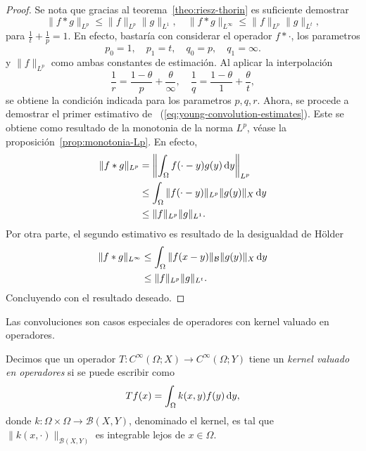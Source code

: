 \begin{proof}
    Se nota que gracias al teorema~\ref{theo:riesz-thorin} es suficiente 
    demostrar 
    \begin{equation}\label{eq:young-convolution-estimates}
        \|f*g\|_{L^p} \leq \|f\|_{L^p} \|g\|_{L^1}, \quad 
        \|f*g\|_{L^\infty} \leq \|f\|_{L^p} \|g\|_{L^t},
    \end{equation}
    para $\frac{1}{t} + \frac{1}{p} = 1$. En efecto, bastaría con considerar 
    el operador $f * \cdot$, los parametros
    \begin{equation*}
        p_0 = 1, \quad p_1 = t, \quad q_0 = p, \quad q_1 = \infty.
    \end{equation*}
    y $\|f\|_{L^p}$ como ambas constantes de estimación.
    Al aplicar la interpolación
    \begin{equation*}
        \frac{1}{r} = \frac{1-\theta}{p} + \frac{\theta}{\infty}, \quad 
        \frac{1}{q} = \frac{1-\theta}{1} + \frac{\theta}{t},
    \end{equation*}
    se obtiene la condición indicada para los parametros $p, q, r$. Ahora, 
    se procede a demostrar el primer estimativo de
    ~(\ref{eq:young-convolution-estimates}). Este se obtiene como resultado de
    la monotonia de la norma $L^p$, véase la proposición~\ref{prop:monotonia-Lp}.
    En efecto,
    \begin{align*}
        \|f*g\|_{L^p} & = \left\| \int_{\Omega} f(\cdot-y)g(y)\mathop{}\!\mathrm{d} y 
        \right\|_{L^p} \\
        & \leq \int_{\Omega} \|f(\cdot-y)\|_{L^p} \|g(y)\|_X\mathop{}\!\mathrm{d} y \\
        & \leq \|f\|_{L^p}\|g\|_{L^1}.
    \end{align*}
    Por otra parte, el segundo estimativo es resultado de la desigualdad de 
    H\"older 
    \begin{align*}
        \|f*g\|_{L^\infty} & \leq \int_{\Omega} \|f(x-y)\|_\mathcal{B}\|g(y)\|_X \mathop{}\!\mathrm{d} y \\
        & \leq \|f\|_{L^p}\|g\|_{L^t}.
    \end{align*}
    Concluyendo con el resultado deseado.
\end{proof}
Las convoluciones son casos especiales de operadores con kernel valuado en operadores.
\begin{definition}
	Decimos que un operador $T:C^\infty(\Omega;X)\rightarrow C^\infty(\Omega;Y)$ tiene un \textit{kernel valuado en operadores} si se puede escribir como
	\begin{equation*}
		Tf(x) = \int_{\Omega}k(x, y)f(y)\mathop{}\!\mathrm{d} y,
	\end{equation*}
	donde $k:\Omega\times\Omega \rightarrow \mathcal{B}(X,Y)$, denominado el kernel, es tal que $\|k(x, \cdot)\|_{\mathcal{B}(X,Y)}$ es integrable lejos de $x \in \Omega $.
	\label{def:operator-kernel}
\end{definition}
